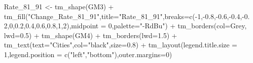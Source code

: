 \documentclass[
]{article}
\newenvironment{Shaded}{\begin{snugshade}}{\end{snugshade}}
\newcommand{\AttributeTok}[1]{\textcolor[rgb]{0.77,0.63,0.00}{#1}}
\newcommand{\DecValTok}[1]{\textcolor[rgb]{0.00,0.00,0.81}{#1}}
\newcommand{\FloatTok}[1]{\textcolor[rgb]{0.00,0.00,0.81}{#1}}
\newcommand{\FunctionTok}[1]{\textcolor[rgb]{0.00,0.00,0.00}{#1}}
\newcommand{\NormalTok}[1]{#1}
\newcommand{\OtherTok}[1]{\textcolor[rgb]{0.56,0.35,0.01}{#1}}
\newcommand{\SpecialCharTok}[1]{\textcolor[rgb]{0.00,0.00,0.00}{#1}}
\newcommand{\StringTok}[1]{\textcolor[rgb]{0.31,0.60,0.02}{#1}}
\begin{document}
\begin{Shaded}
\begin{Highlighting}[]
\NormalTok{Rate\_81\_91 }\OtherTok{\textless{}{-}} \FunctionTok{tm\_shape}\NormalTok{(GM3) }\SpecialCharTok{+}
  \FunctionTok{tm\_fill}\NormalTok{(}\StringTok{"Change\_Rate\_81\_91"}\NormalTok{,}\AttributeTok{title=}\StringTok{"Rate\_81\_91"}\NormalTok{,}\AttributeTok{breaks=}\FunctionTok{c}\NormalTok{(}\SpecialCharTok{{-}}\DecValTok{1}\NormalTok{,}\SpecialCharTok{{-}}\FloatTok{0.8}\NormalTok{,}\SpecialCharTok{{-}}\FloatTok{0.6}\NormalTok{,}\SpecialCharTok{{-}}\FloatTok{0.4}\NormalTok{,}\SpecialCharTok{{-}}\FloatTok{0.2}\NormalTok{,}\DecValTok{0}\NormalTok{,}\FloatTok{0.2}\NormalTok{,}\FloatTok{0.4}\NormalTok{,}\FloatTok{0.6}\NormalTok{,}\FloatTok{0.8}\NormalTok{,}\DecValTok{1}\NormalTok{,}\DecValTok{2}\NormalTok{),}\AttributeTok{midpoint =} \DecValTok{0}\NormalTok{,}\AttributeTok{palette=}\StringTok{"{-}RdBu"}\NormalTok{)  }\SpecialCharTok{+}
  \FunctionTok{tm\_borders}\NormalTok{(}\AttributeTok{col=}\StringTok{\textquotesingle{}Grey\textquotesingle{}}\NormalTok{, }\AttributeTok{lwd=}\FloatTok{0.5}\NormalTok{) }\SpecialCharTok{+}
\FunctionTok{tm\_shape}\NormalTok{(GM4) }\SpecialCharTok{+}
  \FunctionTok{tm\_borders}\NormalTok{(}\AttributeTok{lwd=}\FloatTok{1.5}\NormalTok{) }\SpecialCharTok{+}
  \FunctionTok{tm\_text}\NormalTok{(}\AttributeTok{text=}\StringTok{"Cities"}\NormalTok{,}\AttributeTok{col=}\StringTok{"black"}\NormalTok{,}\AttributeTok{size=}\FloatTok{0.8}\NormalTok{) }\SpecialCharTok{+}
\FunctionTok{tm\_layout}\NormalTok{(}\AttributeTok{legend.title.size =} \DecValTok{1}\NormalTok{,}\AttributeTok{legend.position =} \FunctionTok{c}\NormalTok{(}\StringTok{"left"}\NormalTok{,}\StringTok{"bottom"}\NormalTok{),}\AttributeTok{outer.margins=}\DecValTok{0}\NormalTok{)}


\end{Highlighting}
\end{Shaded}
\end{document}
